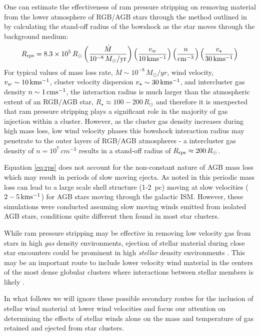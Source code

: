 \documentclass[fleqn,usenatbib]{mnras}
\begin{document}
One can estimate the effectiveness of ram pressure stripping on removing material from the lower atmosphere of RGB/AGB stars through the method outlined in \cite{wilkin1996} by calculating the stand-off radius of the bowshock as the star moves through the background medium:
\begin{equation}
R_{\rm rps} = 8.3 \times 10^5 \, R_\odot \left(\frac{\dot{M}}{10^{-8} \, M_\odot/{\rm yr}} \right) \left( \frac{v_w}{10 \, {\rm km s^{-1}}}\right) \left( \frac{n}{\rm cm^{-3}}\right) \left(\frac{v_\star}{30 \, {\rm km s^{-1}}} \right)
\label{eq:rps}
\end{equation}
For typical values of mass loss rate, $\dot{M} \sim 10^{-8} \, M_\odot/yr$, wind velocity, $v_w \sim 10 \, {\rm km s^{-1}}$, cluster velocity dispersion $v_\star \sim 30 \, {\rm km s^{-1}}$, and intercluster gas density $n \sim 1 \, {\rm cm s^{-1}}$, the interaction radius is much larger than the atmospheric extent of an RGB/AGB star, $R_\star \approx 100-200 \, R_\odot$ and therefore it is unexpected that ram pressure stripping plays a significant role in the majority of gas injection within a cluster.  However,  as the cluster gas density increases during high mass loss, low wind velocity phases this bowshock interaction radius may penetrate to the outer layers of RGB/AGB atmospheres - a intercluster gas density of $n = 10^{7} \, cm^{-3}$ results in a stand-off radius of $R_{\rm rps} \approx 200 \, R_\odot$.

Equation \ref{eq:rps} does not account for the non-constant nature of AGB mass loss which may result in periods of slow moving ejecta.  As noted in \cite{villaver2003,villaver2012} this periodic mass loss can lead to a large scale shell structure (1-2~pc) moving at slow velocities ($2-5 \, {\rm km s^{-1}}$) for AGB stars moving through the galactic ISM.  However, these simulations were conducted assuming slow moving winds emitted from isolated AGB stars, conditions quite different then found in most star clusters.

While ram pressure stripping may be effective in removing low velocity gas from stars in high {\it gas} density environments, ejection of stellar material during close star encounters could be prominent in high {\it stellar} density environments \citep{pas2014}.  
This may be an important route to include lower velocity wind material in the centers of the most dense globular clusters where interactions between stellar members is likely \citep{pooley2003,pas2014}.

In what follows we will ignore these possible secondary routes for the inclusion of stellar wind material at lower wind velocities and focus our attention on determining the effects of stellar winds alone on the mass and temperature of gas retained and ejected from star clusters.\\
\\
\end{document}
